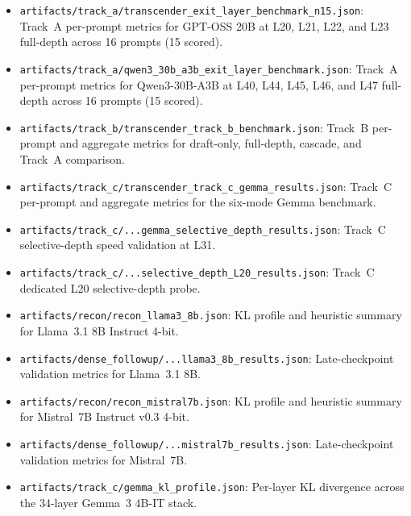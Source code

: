 \documentclass[11pt]{article}
\begin{document}
{\small
\begin{itemize}
\item \texttt{artifacts/track\_a/transcender\_exit\_layer\_benchmark\_n15.json}:
  Track~A per-prompt metrics for GPT-OSS 20B at L20, L21, L22, and L23 full-depth across 16 prompts (15 scored).

\item \texttt{artifacts/track\_a/qwen3\_30b\_a3b\_exit\_layer\_benchmark.json}:
  Track~A per-prompt metrics for Qwen3-30B-A3B at L40, L44, L45, L46, and L47 full-depth across 16 prompts (15 scored).

\item \texttt{artifacts/track\_b/transcender\_track\_b\_benchmark.json}:
  Track~B per-prompt and aggregate metrics for draft-only, full-depth, cascade, and Track~A comparison.

\item \texttt{artifacts/track\_c/transcender\_track\_c\_gemma\_results.json}:
  Track~C per-prompt and aggregate metrics for the six-mode Gemma benchmark.

\item \texttt{artifacts/track\_c/...gemma\_selective\_depth\_results.json}:
  Track~C selective-depth speed validation at L31.

\item \texttt{artifacts/track\_c/...selective\_depth\_L20\_results.json}:
  Track~C dedicated L20 selective-depth probe.

\item \texttt{artifacts/recon/recon\_llama3\_8b.json}:
  KL profile and heuristic summary for Llama~3.1 8B Instruct 4-bit.

\item \texttt{artifacts/dense\_followup/...llama3\_8b\_results.json}:
  Late-checkpoint validation metrics for Llama~3.1 8B.

\item \texttt{artifacts/recon/recon\_mistral7b.json}:
  KL profile and heuristic summary for Mistral~7B Instruct v0.3 4-bit.

\item \texttt{artifacts/dense\_followup/...mistral7b\_results.json}:
  Late-checkpoint validation metrics for Mistral~7B.

\item \texttt{artifacts/track\_c/gemma\_kl\_profile.json}:
  Per-layer KL divergence across the 34-layer Gemma~3 4B-IT stack.
\end{itemize}
}



\end{document}
